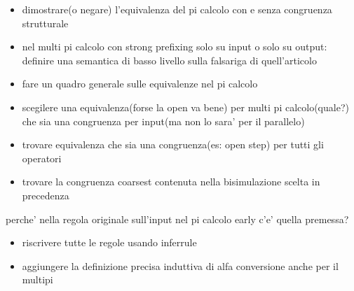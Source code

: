 




\begin{itemize}
  \item
    dimostrare(o negare) l'equivalenza del pi calcolo con e senza congruenza strutturale
  \item
    nel multi pi calcolo con strong prefixing solo su input o solo su output: definire una semantica di basso livello sulla falsariga di quell'articolo
  \item
    fare un quadro generale sulle equivalenze nel pi calcolo
  \item
    scegilere una equivalenza(forse la open va bene) per multi pi calcolo(quale?) che sia una congruenza per input(ma non lo sara' per il parallelo)
  \item
    trovare equivalenza che sia una congruenza(es: open step) per tutti gli operatori
  \item
    trovare la congruenza coarsest contenuta nella bisimulazione scelta in precedenza
\end{itemize}

perche' nella regola originale sull'input nel pi calcolo early c'e' quella premessa?


\begin{itemize}
  \item
    riscrivere tutte le regole usando inferrule
  \item
    aggiungere la definizione precisa induttiva di alfa conversione anche per il multipi
 
\end{itemize}
